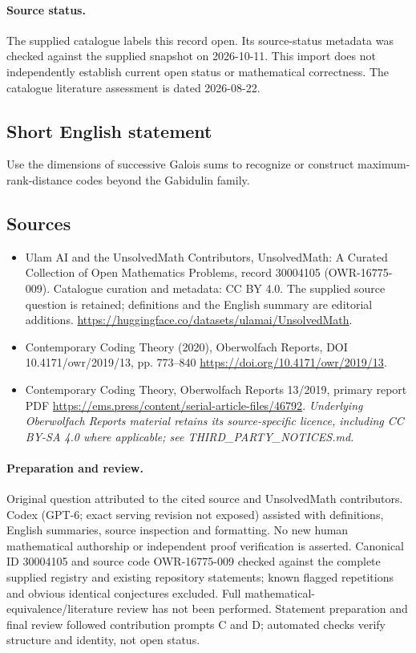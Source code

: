\documentclass[11pt]{article}
\begin{document}
\paragraph{Source status.}
The supplied catalogue labels this record open. Its source-status metadata was checked against the supplied snapshot on 2026-10-11. This import does not independently establish current open status or mathematical correctness. The catalogue literature assessment is dated 2026-08-22.
\subsection{Short English statement}
Use the dimensions of successive Galois sums to recognize or construct maximum-rank-distance codes beyond the Gabidulin family.
\subsection{Sources}
\begin{itemize}
\item[S1] Ulam AI and the UnsolvedMath Contributors, UnsolvedMath: A Curated Collection of Open Mathematics Problems, record 30004105 (OWR-16775-009). Catalogue curation and metadata: CC BY 4.0. The supplied source question is retained; definitions and the English summary are editorial additions.
\url{https://huggingface.co/datasets/ulamai/UnsolvedMath}.
\item[S2] Contemporary Coding Theory (2020), Oberwolfach Reports, DOI 10.4171/owr/2019/13, pp. 773--840
\url{https://doi.org/10.4171/owr/2019/13}.
\item[S3] Contemporary Coding Theory, Oberwolfach Reports 13/2019, primary report PDF
\url{https://ems.press/content/serial-article-files/46792}.
\textit{Underlying Oberwolfach Reports material retains its source-specific licence, including CC BY-SA 4.0 where applicable; see THIRD\_PARTY\_NOTICES.md.}
\end{itemize}
\paragraph{Preparation and review.}
Original question attributed to the cited source and UnsolvedMath contributors. Codex (GPT-6; exact serving revision not exposed) assisted with definitions, English summaries, source inspection and formatting. No new human mathematical authorship or independent proof verification is asserted. Canonical ID 30004105 and source code OWR-16775-009 checked against the complete supplied registry and existing repository statements; known flagged repetitions and obvious identical conjectures excluded. Full mathematical-equivalence/literature review has not been performed. Statement preparation and final review followed contribution prompts C and D; automated checks verify structure and identity, not open status.
\label{end:30004105}
\end{document}
